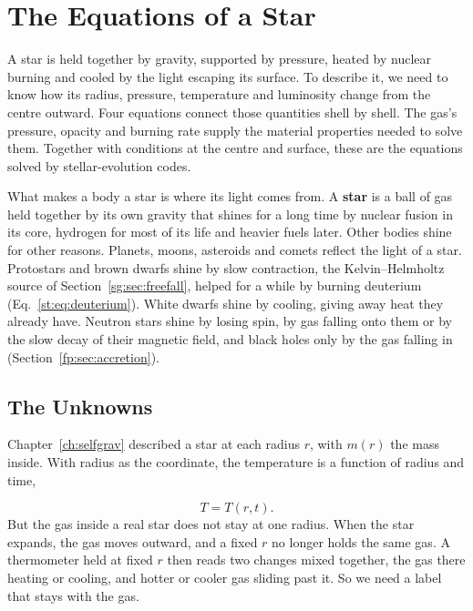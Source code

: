 \chapter{The Equations of a Star}
\label{ch:structure}






A star is held together by gravity, supported by pressure, heated by nuclear burning and cooled by the light escaping its surface. To describe it, we need to know how its radius, pressure, temperature and luminosity change from the centre outward. Four equations connect those quantities shell by shell. The gas's pressure, opacity and burning rate supply the material properties needed to solve them. Together with conditions at the centre and surface, these are the equations solved by stellar-evolution codes.

What makes a body a star is where its light comes from. A \textbf{star} is a ball of gas held together by its own gravity that shines for a long time by nuclear fusion in its core, hydrogen for most of its life and heavier fuels later. Other bodies shine for other reasons. Planets, moons, asteroids and comets reflect the light of a star. Protostars and brown dwarfs shine by slow contraction, the Kelvin–Helmholtz source of Section~\ref{sg:sec:freefall}, helped for a while by burning deuterium (Eq.~\eqref{st:eq:deuterium}). White dwarfs shine by cooling, giving away heat they already have. Neutron stars shine by losing spin, by gas falling onto them or by the slow decay of their magnetic field, and black holes only by the gas falling in (Section~\ref{fp:sec:accretion}).

\section{The Unknowns}
\label{st:sec:unknowns}

Chapter~\ref{ch:selfgrav} described a star at each radius $r$, with $m(r)$ the mass inside. With radius as the coordinate, the temperature is a function of radius and time,

\[
T=T(r,t).
\]
But the gas inside a real star does not stay at one radius. When the star expands, the gas moves outward, and a fixed $r$ no longer holds the same gas. A thermometer held at fixed $r$ then reads two changes mixed together, the gas there heating or cooling, and hotter or cooler gas sliding past it. So we need a label that stays with the gas.

